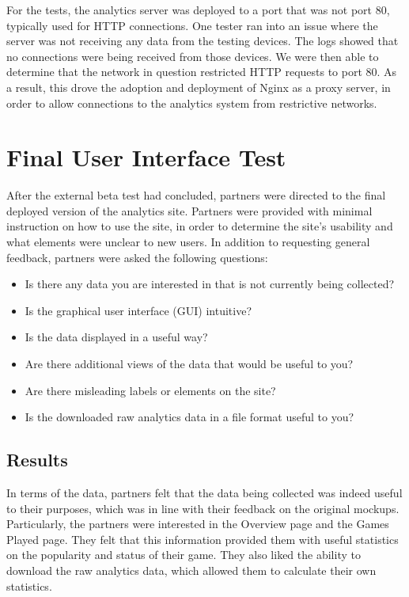 For the tests, the analytics server was deployed to a port that was not port 80, typically used for HTTP connections. One tester ran into an issue where the server was not receiving any data from the testing devices. The logs showed that no connections were being received from those devices. We were then able to determine that the network in question restricted HTTP requests to port 80. As a result, this drove the adoption and deployment of Nginx as a proxy server, in order to allow connections to the analytics system from restrictive networks.

\section{Final User Interface Test}

After the external beta test had concluded, partners were directed to the final deployed version of the analytics site. Partners were provided with minimal instruction on how to use the site, in order to determine the site's usability and what elements were unclear to new users. In addition to requesting general feedback, partners were asked the following questions:

\begin{itemize}
	\item Is there any data you are interested in that is not currently being collected?
	\item Is the graphical user interface (GUI) intuitive? 
	\item Is the data displayed in a useful way? 
	\item Are there additional views of the data that would be useful to you?
	\item Are there misleading labels or elements on the site?
	\item Is the downloaded raw analytics data in a file format useful to you?
\end{itemize}

\subsection{Results}

In terms of the data, partners felt that the data being collected was indeed useful to their purposes, which was in line with their feedback on the original mockups. Particularly, the partners were interested in the Overview page and the Games Played page. They felt that this information provided them with useful statistics on the popularity and status of their game. They also liked the ability to download the raw analytics data, which allowed them to calculate their own statistics.

